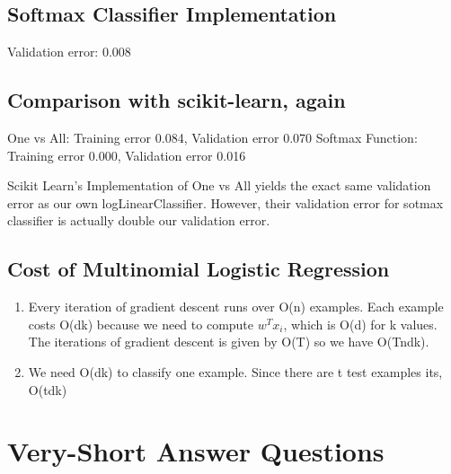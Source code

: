 \documentclass{article}
\begin{document}
\subsection{Softmax Classifier Implementation}
Validation error: 0.008

\subsection{Comparison with scikit-learn, again}
One vs All: Training error 0.084, Validation error 0.070
Softmax Function: Training error 0.000, Validation error 0.016

Scikit Learn's Implementation of One vs All yields the exact same validation error as our own logLinearClassifier. However,
their validation error for sotmax classifier is actually double our validation error.

\subsection{Cost of Multinomial Logistic Regression}
\begin{enumerate}
    \item Every iteration of gradient descent runs over O(n) examples. Each example costs O(dk) because we need to 
    compute $w^Tx_i$, which is O(d) for k values. The iterations of gradient descent is given by O(T) so we have
    O(Tndk).
    \item We need O(dk) to classify one example. Since there are t test examples its, O(tdk) 
\end{enumerate}

\section{Very-Short Answer Questions}
\end{document}
